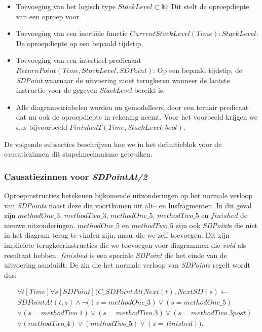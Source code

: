 \begin{itemize}
	\item Toevoeging van het logisch type $StackLevel \subset \mathbb{N}$: Dit stelt de oproepdiepte van een oproep voor.
	\item Toevoeging van een inerti\"ele functie $CurrentStackLevel(Time) : StackLevel$: De oproepdiepte op een bepaald tijdstip.
	\item Toevoeging van een intertieel predicaaat \\ $ReturnPoint(Time, StackLevel, SDPoint)$: Op een bepaald tijdstip, de \textit{SDPoint} waarnaar de uitvoering moet terugkeren wanneer de laatste instructie voor de gegeven \textit{StackLevel} bereikt is.
	\item Alle diagramvariabelen worden nu gemodelleerd door een ternair predicaat dat nu ook de oproepdiepte in rekening neemt. Voor het voorbeeld krijgen we dus bijvoorbeeld $FinishedT(Time, StackLevel, bool)$.
\end{itemize}

De volgende subsecties beschrijven hoe we in het definitieblok voor de causatiezinnen dit stapelmechanisme gebruiken.

\subsubsection{Causatiezinnen voor \textit{SDPointAt/2}}\label{sec:sd-rec-cause}
Oproepinstructies betekenen bijkomende uitzonderingen op het normale verloop van \textit{SDPoints} naast deze die voortkomen uit alt-- en lusfragmenten. In dit geval zijn $methodOne\_3$, $methodTwo\_3$, $methodOne\_5$, $methodTwo\_5$ en $finished$ de nieuwe uitzonderingen. $methodOne\_5$ en $methodTwo\_5$ zijn ook \textit{SDPoint}s die niet in het diagram terug te vinden zijn, maar die we zelf toevoegen. Dit zijn impliciete terugkeerinstructies die we toevoegen voor diagrammen die \textit{void} als resultaat hebben. $finished$ is een speciale \textit{SDPoint} die het einde van de uitvoering aanduidt. De zin die het normale verloop van \textit{SDPoint}s regelt wordt dus:

\begin{align}
	& \nonumber \forall{t}[Time]\forall{s}[SDPoint](C\_SDPointAt(Next(t), NextSD(s) \leftarrow \\ \nonumber &SDPointAt(t,s) \land \lnot((s = methodOne\_3) \lor (s = methodOne\_5) \\ \nonumber &\lor (s = methodTwo\_1) \lor (s = methodTwo\_3) \lor (s = methodTwo\_3post) \\ &\lor (methodTwo\_4) \lor (methodTwo\_5) \lor (s = finished)).
\end{align}

